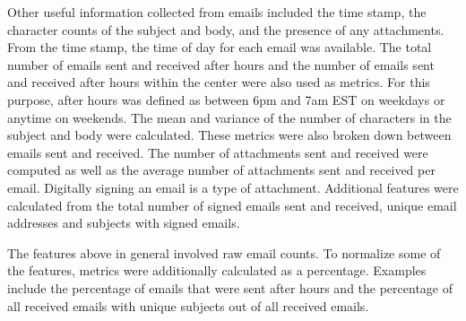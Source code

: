 \documentclass[12pt]{report}
\begin{document}
Other useful information collected from emails included the time stamp, the character counts of the subject and body, and the presence of any attachments.
From the time stamp, the time of day for each email was available.
The total number of emails sent and received after hours and the number of emails sent and received after hours within the center were also used as metrics.
For this purpose, after hours was defined as between 6pm and 7am EST on weekdays or anytime on weekends.
The mean and variance of the number of characters in the subject and body were calculated.
These metrics were also broken down between emails sent and received.
The number of attachments sent and received were computed as well as the average number of attachments sent and received per email.
Digitally signing an email is a type of attachment.
Additional features were calculated from the total number of signed emails sent and received, unique email addresses and subjects with signed emails.

The features above in general involved raw email counts.
To normalize some of the features, metrics were additionally calculated as a percentage.
Examples include the percentage of emails that were sent after hours and the percentage of all received emails with unique subjects out of all received emails.
\end{document}

